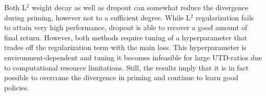 Both L$^2$ weight decay as well as dropout can somewhat reduce the divergence during priming, however not to a sufficient degree.
While L$^2$ regularization fails to attain very high performance, dropout is able to recover a good amount of final return.
However, both methods require tuning of a hyperparameter that trades off the regularization term with the main loss.
This hyperparameter is environment-dependent and tuning it becomes infeasible for large UTD-ratios due to computational resource limitations. 
Still, the results imply that it is in fact possible to overcome the divergence in priming and continue to learn good policies.





